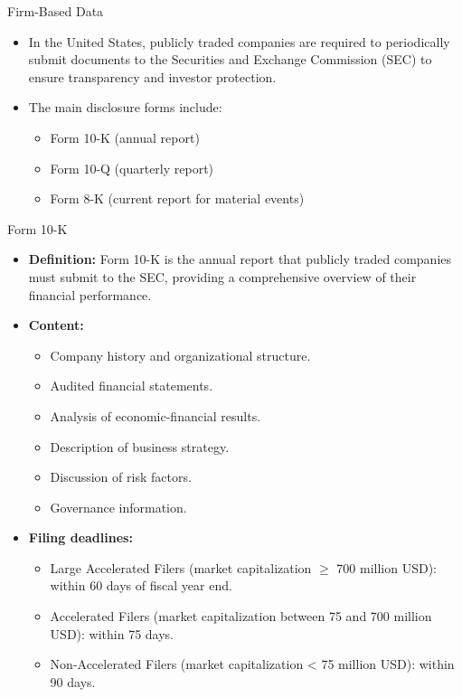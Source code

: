 \documentclass[aspectratio=169]{beamer}
\begin{document}
%
%
\begin{frame}{Firm-Based Data}
\begin{itemize}
\item In the United States, publicly traded companies are required to periodically submit documents to the Securities and Exchange Commission (SEC) to ensure transparency and investor protection.
\item The main disclosure forms include:
\begin{itemize}
\item Form 10-K (annual report)
\item Form 10-Q (quarterly report)
\item Form 8-K (current report for material events)
\end{itemize}
\end{itemize}
\end{frame}
%
%
\begin{frame}{Form 10-K}
\begin{itemize}
\item \textbf{Definition:} Form 10-K is the annual report that publicly traded companies must submit to the SEC, providing a comprehensive overview of their financial performance.
\item \textbf{Content:}
\begin{itemize}
\item Company history and organizational structure.
\item Audited financial statements.
\item Analysis of economic-financial results.
\item Description of business strategy.
\item Discussion of risk factors.
\item Governance information.
\end{itemize}
\item \textbf{Filing deadlines:}
\begin{itemize}
\item Large Accelerated Filers (market capitalization $\ge$ 700 million USD): within 60 days of fiscal year end.
\item Accelerated Filers (market capitalization between 75 and 700 million USD): within 75 days.
\item Non-Accelerated Filers (market capitalization < 75 million USD): within 90 days.
\end{itemize}
\end{itemize}
\end{frame}
\end{document}
